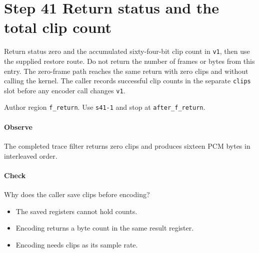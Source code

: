 \section{Step 41 Return status and the total clip count}\label{pcm-wav-s41}
Return status zero and the accumulated sixty-four-bit clip count in \texttt{v1}, then use the supplied restore route. Do not return the number of frames or bytes from this entry. The zero-frame path reaches the same return with zero clips and without calling the kernel. The caller records successful clip counts in the separate \texttt{clips} slot before any encoder call changes \texttt{v1}.

Author region \texttt{f\_return}. Use \texttt{s41-1} and stop at \texttt{after\_f\_return}.

\paragraph{Observe} The completed trace filter returns zero clips and produces sixteen PCM bytes in interleaved order.

\paragraph{Check} Why does the caller save clips before encoding?
\begin{itemize}
\item[A.] The saved registers cannot hold counts.
\item[B.] Encoding returns a byte count in the same result register.
\item[C.] Encoding needs clips as its sample rate.
\end{itemize}

